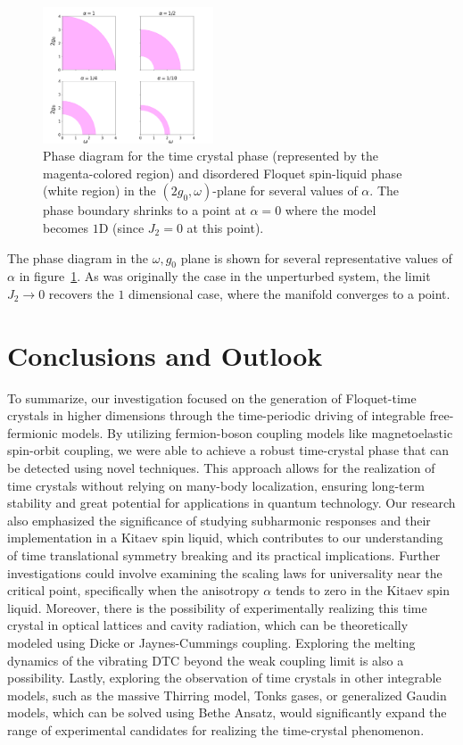 \documentclass[preprint,5p,times,twocolumn]{elsarticle}
\begin{document}
\begin{figure}[t!]
    \centering
    \includegraphics[width=0.45\textwidth, keepaspectratio]{fig6_phase_diagram.png}
    \caption{Phase diagram for the time crystal phase (represented by the magenta-colored region) and disordered Floquet spin-liquid  phase (white region) in the $\left(2g_{0},\omega\right)$-plane for several values of $\alpha$. The phase boundary shrinks to a point at $\alpha=0$ where the model becomes $1 \mathrm{D}$ (since $J_{2}=0$ at this point).}
    \label{fig:phasediag}
\end{figure}
The phase diagram in the $\omega, g_0$ plane is shown for several representative values of $\alpha$ in figure~\ref{fig:phasediag}. As was originally the case in the unperturbed system,  the limit $J_2\rightarrow 0$ recovers the $1$ dimensional case, where the manifold converges to a point.

\section{Conclusions and Outlook}
To summarize, our investigation focused on the generation of Floquet-time crystals in higher dimensions through the time-periodic driving of integrable free-fermionic models. By utilizing fermion-boson coupling models like magnetoelastic spin-orbit coupling, we were able to achieve a robust time-crystal phase that can be detected using novel techniques. This approach allows for the realization of time crystals without relying on many-body localization, ensuring long-term stability and great potential for applications in quantum technology. Our research also emphasized the significance of studying subharmonic responses and their implementation in a Kitaev spin liquid, which contributes to our understanding of time translational symmetry breaking and its practical implications. Further investigations could involve examining the scaling laws for universality near the critical point, specifically when the anisotropy $\alpha$ tends to zero in the Kitaev spin liquid. Moreover, there is the possibility of experimentally realizing this time crystal in optical lattices and cavity radiation, which can be theoretically modeled using Dicke or Jaynes-Cummings coupling. Exploring the melting dynamics of the vibrating DTC beyond the weak coupling limit is also a possibility. Lastly, exploring the observation of time crystals in other integrable models, such as the massive Thirring model, Tonks gases, or generalized Gaudin models, which can be solved using Bethe Ansatz, would significantly expand the range of experimental candidates for realizing the time-crystal phenomenon.
\end{document}
